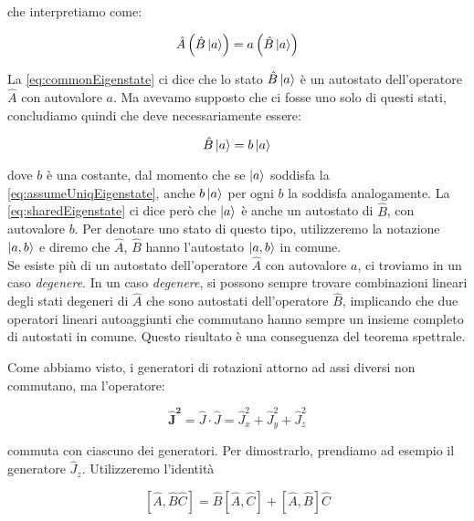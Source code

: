 che interpretiamo come:

	\begin{equation} \label{eq:commonEigenstate}
		\hat{A} \left ( \hat{B} \ket{a} \right ) = a \left ( \hat{B} \ket{a} \right )
	\end{equation}

La \eqref{eq:commonEigenstate} ci dice che lo stato $\hat{B} \ket{a}$ \`e un autostato dell'operatore $\hat{A}$ con autovalore $a$. Ma avevamo supposto che ci fosse uno solo di questi stati, concludiamo quindi che deve necessariamente essere:

	\begin{equation} \label{eq:sharedEigenstate}
		\hat{B}\ket{a} = b \ket{a}
	\end{equation}

dove $b$ \`e una costante, dal momento che se $\ket{a}$ soddisfa la \eqref{eq:assumeUniqEigenstate}, anche $b \ket{a}$ per ogni $b$ la soddisfa analogamente. La \eqref{eq:sharedEigenstate} ci dice per\`o che $\ket{a}$ \`e anche un autostato di $\hat{B}$, con autovalore $b$. Per denotare uno stato di questo tipo, utilizzeremo la notazione $\ket{a, b}$ e diremo che $\hat{A}$, $\hat{B}$ hanno l'autostato $\ket{a, b}$ in comune. \\

Se esiste pi\`u di un autostato dell'operatore $\hat{A}$ con autovalore $a$, ci troviamo in un caso \textit{degenere}. In un caso \textit{degenere}, si possono sempre trovare combinazioni lineari degli stati degeneri di $\hat{A}$ che sono autostati dell'operatore $\hat{B}$, implicando che due operatori lineari autoaggiunti che commutano hanno sempre un insieme completo di autostati in comune. Questo risultato \`e una conseguenza del teorema spettrale.

Come abbiamo visto, i generatori di rotazioni attorno ad assi diversi non commutano, ma l'operatore:

	\begin{equation}
		\mathbf{\hat{J}^2} = \hat{J} \cdot \hat{J} = \hat{J}_x^2 + \hat{J}_y^2 + \hat{J}_z^2
	\end{equation}

commuta con ciascuno dei generatori. Per dimostrarlo, prendiamo ad esempio il generatore $\hat{J}_z$. Utilizzeremo l'identit\`a

	\begin{equation} \label{eq:commutatorsTrick}
		\left [ \hat{A}, \hat{B}\hat{C} \right ] = \hat{B} \left [ \hat{A}, \hat{C} \right ] + \left [ \hat{A}, \hat{B} \right ] \hat{C}
	\end{equation}

